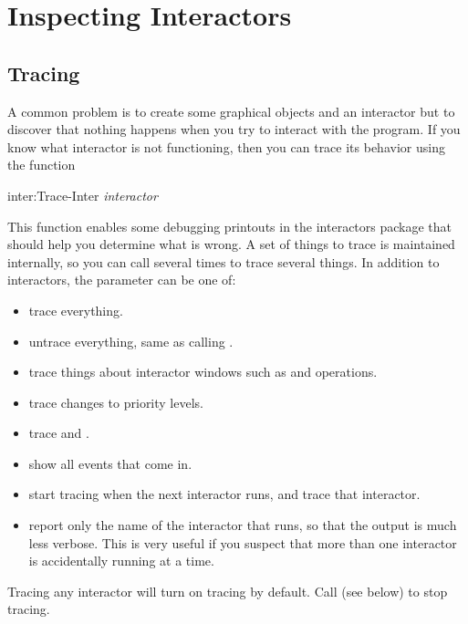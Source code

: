 \chapter{Inspecting Interactors}
\section{Tracing}
A common problem is to create some graphical objects and an interactor
but to discover that nothing happens when you try to interact with
the program.  If you know what interactor is not functioning, then
you can trace its behavior using the function
\begin{programexample}
inter:Trace-Inter {\it interactor}\value{function}
\end{programexample}
This function enables some debugging printouts in the interactors
package that should help you determine what is wrong.  A set of
things to trace is maintained internally, so you can call
 several times to trace several things.
In addition to interactors, the parameter can be one of:
\begin{itemize}
\item {} \dash trace everything.

\item {} \dash untrace everything, same as calling .

\item {} \dash trace things about interactor windows such as
 and  operations.

\item {} \dash trace changes to priority levels.

\item {} \dash trace  and .

\item {} \dash show all events that come in.

\item {} \dash start tracing when the next interactor runs, and trace
that interactor.

\item {} \dash report only the name of the interactor that runs, so that
the output is much less verbose.  This is very useful if you suspect that more
than one interactor is accidentally running at a time.
\end{itemize}
Tracing any interactor will turn on  tracing by default.  Call
 (see below) to stop  tracing.

